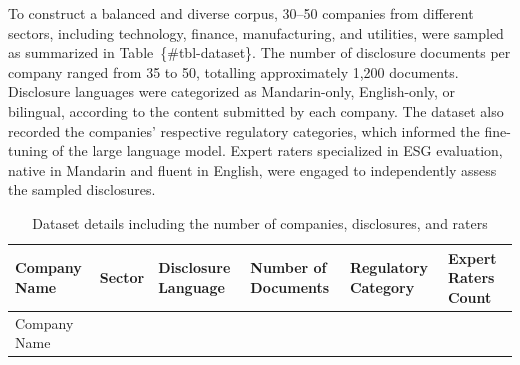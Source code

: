 \documentclass[
  12pt,
]{article}
\begin{document}
To construct a balanced and diverse corpus, 30--50 companies from
different sectors, including technology, finance, manufacturing, and
utilities, were sampled as summarized in Table~\{\#tbl-dataset\}. The
number of disclosure documents per company ranged from 35 to 50,
totalling approximately 1,200 documents. Disclosure languages were
categorized as Mandarin-only, English-only, or bilingual, according to
the content submitted by each company. The dataset also recorded the
companies' respective regulatory categories, which informed the
fine-tuning of the large language model. Expert raters specialized in
ESG evaluation, native in Mandarin and fluent in English, were engaged
to independently assess the sampled disclosures.

\begin{longtable}[]{@{}
  >{\raggedright\arraybackslash}p{}
  >{\raggedright\arraybackslash}p{}
  >{\raggedright\arraybackslash}p{}
  >{\raggedright\arraybackslash}p{}
  >{\raggedright\arraybackslash}p{}
  >{\raggedright\arraybackslash}p{}@{}}
\caption{Dataset details including the number of companies, disclosures,
and raters}\label{tbl-dataset}\tabularnewline
\toprule\noalign{}
\begin{minipage}[b]{\linewidth}\raggedright
Company Name
\end{minipage} & \begin{minipage}[b]{\linewidth}\raggedright
Sector
\end{minipage} & \begin{minipage}[b]{\linewidth}\raggedright
Disclosure Language
\end{minipage} & \begin{minipage}[b]{\linewidth}\raggedright
Number of Documents
\end{minipage} & \begin{minipage}[b]{\linewidth}\raggedright
Regulatory Category
\end{minipage} & \begin{minipage}[b]{\linewidth}\raggedright
Expert Raters Count
\end{minipage} \\
\midrule\noalign{}
\endfirsthead
\toprule\noalign{}
\begin{minipage}[b]{\linewidth}\raggedright
Company Name
\end{minipage} & \begin{minipage}[b]{\linewidth}\raggedright

\end{minipage}
\end{longtable}
\end{document}
